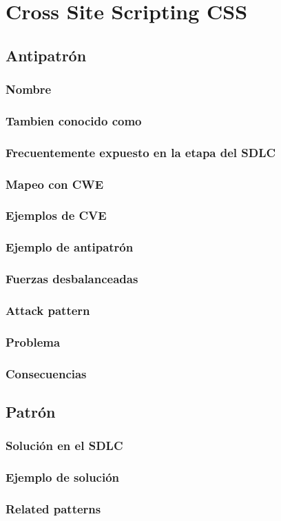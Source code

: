 \chapter{Cross Site Scripting CSS}
\section{Antipatrón}
\subsection{Nombre}
\subsection{Tambien conocido como}
\subsection{Frecuentemente expuesto en la etapa del SDLC}
\subsection{Mapeo con CWE}
\subsection{Ejemplos de CVE}
\subsection{Ejemplo de antipatrón}
\subsection{Fuerzas desbalanceadas}
\subsection{Attack pattern}
\subsection{Problema}
\subsection{Consecuencias}

\section{Patrón}
\subsection{Solución en el SDLC}
\subsection{Ejemplo de solución}
\subsection{Related patterns}

